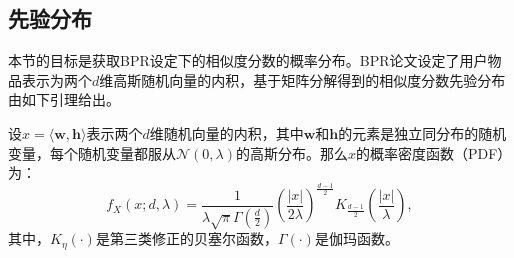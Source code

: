 \subsection{先验分布}
本节的目标是获取BPR设定下的相似度分数的概率分布。BPR论文设定了用户物品表示为两个$d$维高斯随机向量的内积，基于矩阵分解得到的相似度分数先验分布由如下引理给出。
\begin{lemma}\label{Lemma2:AprioriDistribution}
设$x=\langle \mathbf{w}, \mathbf{h} \rangle$表示两个$d$维随机向量的内积，其中$\mathbf{w}$和$\mathbf{h}$的元素是独立同分布的随机变量，每个随机变量都服从$\mathcal{N}(0, \lambda)$的高斯分布。那么$x$的概率密度函数（PDF）为：
	\begin{equation}
		f_{X}(x; d, \lambda) = \frac{1}{\lambda \sqrt{\pi} \Gamma(\frac{d}{2})}\left(\frac{|x|}{2\lambda} \right)^{\frac{d-1}{2}}K_{\frac{d-1}{2}}\left(\frac{|x|}{\lambda}\right),
	\end{equation}
	其中，$K_{\eta}(\cdot)$是第三类修正的贝塞尔函数，$\Gamma(\cdot)$是伽玛函数。
\end{lemma}
